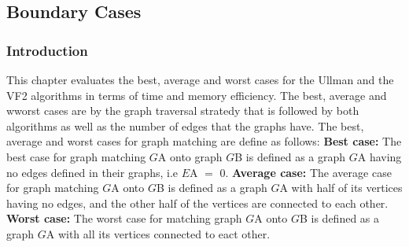 \subsection{Boundary Cases}
\label{Boundary Cases}

\subsubsection{Introduction}
This chapter evaluates the best, average and worst cases for the Ullman and the VF2 algorithms in terms of time and memory efficiency. The best, average and wworst 
cases are by the graph traversal stratedy that is followed by both algorithms as well as the number of edges that the graphs have.\newline\newline
The best, average and worst cases for graph matching are define as follows:\newline\newline
\textbf{Best case:} The best case for graph matching $G${\tiny A} onto graph $G${\tiny B} is defined as a graph $G${\tiny A} having no 
edges defined in their graphs, i.e $E${\tiny A} $=$ 0. \newline\newline
\textbf{Average case:} The average case for graph matching $G${\tiny A} onto $G${\tiny B} is defined as a graph $G${\tiny A} with half of its vertices having 
no edges, and the other half of the vertices are connected to each other.\newline\newline
\textbf{Worst case:} The worst case for matching graph $G${\tiny A} onto $G${\tiny B} is defined as a graph $G${\tiny A} with all its vertices connected to eact other.
